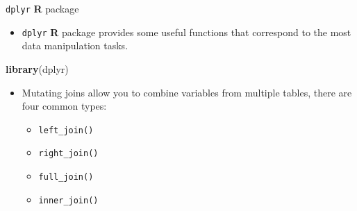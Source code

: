 \documentclass[ignorenonframetext,]{beamer}
\newenvironment{Shaded}{\begin{snugshade}}{\end{snugshade}}
\newcommand{\KeywordTok}[1]{\textcolor[rgb]{0.13,0.29,0.53}{\textbf{#1}}}
\newcommand{\NormalTok}[1]{#1}
\providecommand{\tightlist}{%
  \setlength{\itemsep}{0pt}\setlength{\parskip}{0pt}}
\let\oldShaded\Shaded
\let\endoldShaded\endShaded
\renewenvironment{Shaded}{\footnotesize\oldShaded}{\endoldShaded}
\begin{document}
\begin{frame}[fragile]{\texttt{dplyr} \textbf{R} package}

\begin{itemize}
\tightlist
\item
  \texttt{dplyr} \textbf{R} package provides some useful functions that
  correspond to the most data manipulation tasks.
\end{itemize}

\begin{Shaded}
\begin{Highlighting}[]
\KeywordTok{library}\NormalTok{(dplyr)}
\end{Highlighting}
\end{Shaded}

\begin{itemize}
\tightlist
\item
  Mutating joins allow you to combine variables from multiple tables,
  there are four common types:

  \begin{itemize}
  \tightlist
  \item
    \texttt{left\_join()}
  \item
    \texttt{right\_join()}
  \item
    \texttt{full\_join()}
  \item
    \texttt{inner\_join()}
  \end{itemize}
\end{itemize}

\end{frame}
\end{document}
